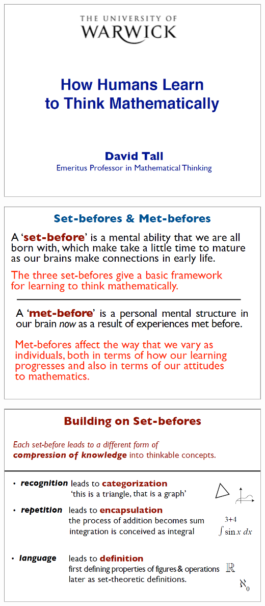 \documentclass{article}
\begin{document}
\begin{minipage}[t]{0.32\linewidth}%
	\includegraphics[width=\textwidth]{david_tall/dt1.png}%
	
	\includegraphics[width=\textwidth]{david_tall/dt4.png}%
	
	\includegraphics[width=\textwidth]{david_tall/dt7.png}%
	

\end{minipage}
\end{document}
